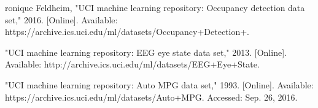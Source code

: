 \documentclass[conference]{IEEEtran}  %
\begin{document}
\begin{thebibliography}{9}
 ronique Feldheim, "UCI machine learning repository: Occupancy detection data set," 2016. [Online]. Available: https://archive.ics.uci.edu/ml/datasets/Occupancy+Detection+.

 "UCI machine learning repository: EEG eye state data set," 2013. [Online]. Available: http://archive.ics.uci.edu/ml/datasets/EEG+Eye+State.

 "UCI machine learning repository: Auto MPG data set," 1993. [Online]. Available: https://archive.ics.uci.edu/ml/datasets/Auto+MPG. Accessed: Sep. 26, 2016.


\end{thebibliography}
\end{document}
